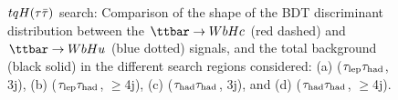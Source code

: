 \begin{figure}[t]
\begin{center}
 \\
 \\
\caption{$tqH(\tau\bar{\tau})$ search: Comparison of the shape of the BDT discriminant distribution between the $\Hc$ (red dashed) and $\Hu$ (blue dotted) signals, 
and the total background (black solid) in the different search regions considered:
(a) ($\tau_{\mathrm{lep}} \tau_{\mathrm{had}}$, 3j), (b) ($\tau_{\mathrm{lep}} \tau_{\mathrm{had}}$, $\geq$4j), (c) ($\tau_{\mathrm{had}} \tau_{\mathrm{had}}$, 3j), and (d) ($\tau_{\mathrm{had}} \tau_{\mathrm{had}}$, $\geq$4j). }
\label{fig:BDT}
\end{center}
\end{figure}
